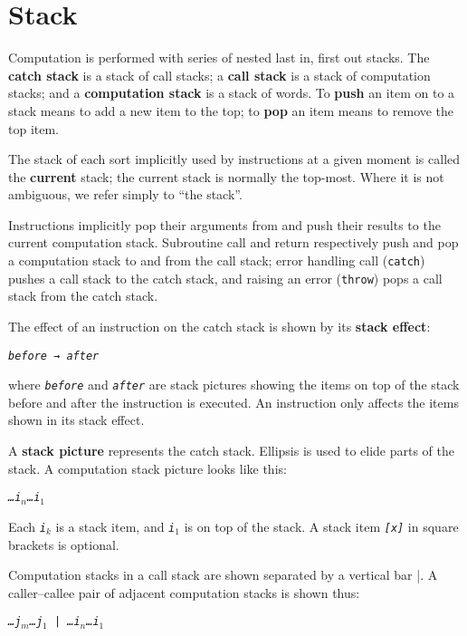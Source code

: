 \documentclass[a4paper]{article}
\newcommand{\spic}[1]{\texttt{\slshape{#1\/}}}
\begin{document}
\section{Stack}

Computation is performed with series of nested last in, first out stacks. The {\bf catch stack} is a stack of call stacks; a {\bf call stack} is a stack of computation stacks; and a {\bf computation stack} is a stack of words. To {\bf push} an item on to a stack means to add a new item to the top; to {\bf pop} an item means to remove the top item.

The stack of each sort implicitly used by instructions at a given moment is called the {\bf current} stack; the current stack is normally the top-most. Where it is not ambiguous, we refer simply to “the stack”.

Instructions implicitly pop their arguments from and push their results to the current computation stack. Subroutine call and return respectively push and pop a computation stack to and from the call stack; error handling call ({\tt catch}) pushes a call stack to the catch stack, and raising an error ({\tt throw}) pops a call stack from the catch stack.

The effect of an instruction on the catch stack is shown by its {\bf stack effect}:

\begin{center}
  {\tt \spic{before → after}}
\end{center}

\noindent where \spic{before} and \spic{after} are stack pictures showing the items on top of the stack before and after the instruction is executed. An instruction only affects the items shown in its stack effect.

A {\bf stack picture} represents the catch stack. Ellipsis is used to elide parts of the stack. A computation stack picture looks like this:

\begin{center}
\spic{…i$_n$\dots i$_1$}
\end{center}

\noindent Each \spic{i$_k$} is a stack item, and \spic{i$_1$} is on top of the stack. A stack item \spic{[x]} in square brackets is optional.

Computation stacks in a call stack are shown separated by a vertical bar {\rm |}. A caller–callee pair of adjacent computation stacks is shown thus:

\begin{center}
\spic{…j$_m$\dots j$_1$ {\rm |} …i$_n$\dots i$_1$}
\end{center}
\end{document}
